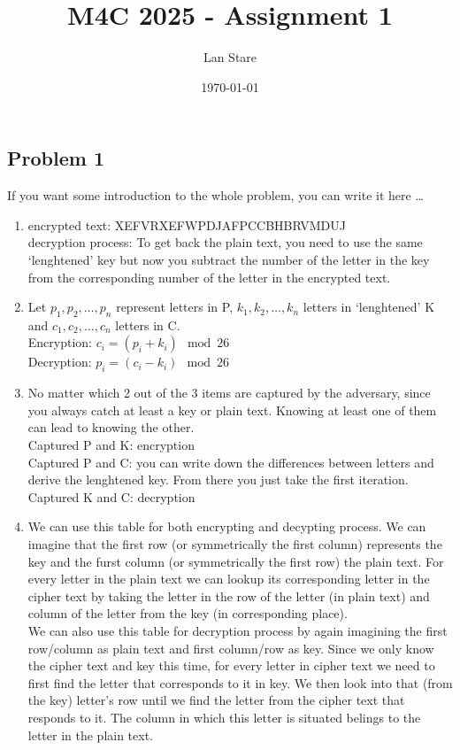 \documentclass[a4paper,10pt]{article}
\title{M4C 2025 \--  Assignment 1}
\author{Lan Stare}
\date{\today}
\begin{document}
\maketitle

\subsection*{Problem 1}

If you want some introduction to the whole problem, you can write it here \ldots
 
\begin{enumerate}[label= (\alph*)]

 \item encrypted text: XEFVRXEFWPDJAFPCCBHBRVMDUJ\\
 decryption process: To get back the plain text, you need to use the same `lenghtened' key but now you subtract the number of the letter in the key from the corresponding number of the letter in the encrypted text.

 \item Let $p_1, p_2, \ldots, p_n$ represent letters in P,  $k_1, k_2, \ldots, k_n$ letters in `lenghtened' K and $c_1, c_2, \ldots, c_n$ letters in C.\\
 Encryption: $c_i = (p_i + k_i)\mod26$\\
 Decryption: $p_i = (c_i - k_i)\mod26$
 \item No matter which 2 out of the 3 items are captured by the adversary, since you always catch at least a key or plain text. Knowing at least one of them can lead to knowing the other.\\
 Captured P and K: encryption\\
 Captured P and C: you can write down the differences between letters and derive the lenghtened key. From there you just take the first iteration.\\
 Captured K and C: decryption

 \item We can use this table for both encrypting and decypting process. We can imagine that the first row (or symmetrically the first column) represents the key and the furst column (or symmetrically the first row) the plain text. For every letter in the plain text we can lookup its corresponding letter in the cipher text by taking the letter in the row of the letter (in plain text) and column of the letter from the key (in corresponding place).\\
 We can also use this table for decryption process by again imagining the first row/column as plain text and first column/row as key. Since we only know the cipher text and key this time, for every letter in cipher text we need to first find the letter that corresponds to it in key. We then look into that (from the key) letter's row until we find the letter from the cipher text that responds to it. The column in which this letter is situated belings to the letter in the plain text.

\end{enumerate}
\end{document}
